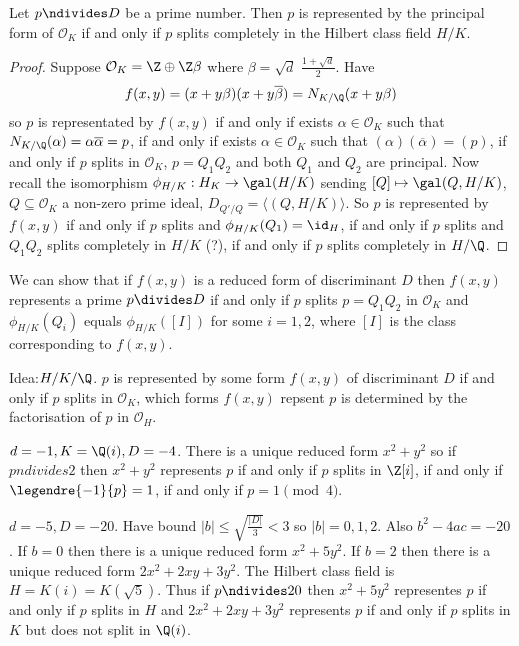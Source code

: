 \documentclass[a4paper]{article}
\renewcommand*{\O}{\mathcal{O}}
\begin{document}
\begin{corollary}
  Let \(p \ndivides D\) be a prime number. Then \(p\) is represented by the principal form of \(\O_K\) if and only if \(p\) splits completely in the Hilbert class field \(H/K\).
\end{corollary}

\begin{proof}
  Suppose \(\O_K = \Z \oplus \Z \beta\) where \(\beta = \sqrt d\) \(\frac{1 + \sqrt d}{2}\). Have
  \[
    f(x, y) = (x + y\beta)(x + y \overline \beta) = N_{K/\Q}(x + y \beta)
  \]
  so \(p\) is representated by \(f(x, y)\) if and only if exists \(\alpha \in \O_K\) such that \(N_{K/\Q}(\alpha) = \alpha \overline \alpha = p\), if and only if exists \(\alpha \in \O_K\) such that \((\alpha)(\overline \alpha) = (p)\), if and only if \(p\) splits in \(\O_K\), \(p = Q_1 Q_2\) and both \(Q_1\) and \(Q_2\) are principal. Now recall the isomorphism \(\phi_{H/K}: H_K \to \gal(H/K)\) sending \([Q] \mapsto \gal(Q, H/K)\), \(Q \subseteq \O_K\) a non-zero prime ideal, \(D_{Q'/Q} = \langle (Q, H/K) \rangle\). So \(p\) is represented by \(f(x, y)\) if and only if \(p\) splits and \(\phi_{H/K}(Q_1) = \id_H\), if and only if \(p\) splits and \(Q_1Q_2\) splits completely in \(H/K\) (?), if and only if \(p\) splits completely in \(H/\Q\).
\end{proof}

We can show that if \(f(x, y)\) is a reduced form of discriminant \(D\) then \(f(x, y)\) represents a prime \(p \divides D\) if and only if \(p\) splits \(p = Q_1Q_2\) in \(\O_K\) and \(\phi_{H/K}(Q_i)\) equals \(\phi_{H/K}([I])\) for some \(i = 1, 2\), where \([I]\) is the class corresponding to \(f(x, y)\).

Idea:\(H/K/\Q\). \(p\) is represented by some form \(f(x, y)\) of discriminant \(D\) if and only if \(p\) splits in \(\O_K\), which forms \(f(x, y)\) repsent \(p\) is determined by the factorisation of \(p\) in \(\O_H\).

\begin{eg}
  \(d = -1, K = \Q(i), D = -4\). There is a unique reduced form \(x^2 + y^2\) so if \(p ndivides 2\) then \(x^2 + y^2\) represents \(p\) if and only if \(p\) splits in \(\Z[i]\), if and only if \(\legendre{-1}{p} = 1\), if and only if \(p = 1 \pmod 4\).
\end{eg}

\begin{eg}
  \(d = -5, D = -20\). Have bound \(|b| \leq \sqrt{\frac{|D|}{3}} < 3\) so \(|b| = 0, 1, 2\). Also \(b^2 - 4ac = -20\). If \(b = 0\) then there is a unique reduced form \(x^2 + 5y^2\). If \(b = 2\) then there is a unique reduced form \(2x^2 + 2xy + 3y^2\). The Hilbert class field is \(H = K(i) = K(\sqrt 5)\). Thus if \(p \ndivides 20\) then \(x^2 + 5y^2\) representes \(p\) if and only if \(p\) splits in \(H\) and \(2x^2 + 2xy + 3y^2\) represents \(p\) if and only if \(p\) splits in \(K\) but does not split in \(\Q(i)\).
\end{eg}



\printindex
\end{document}
